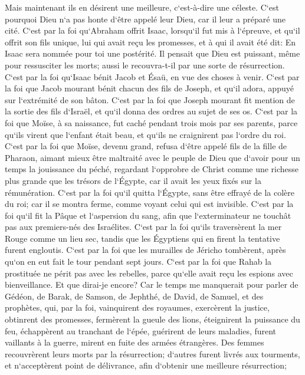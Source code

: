 \verse Mais maintenant ils en désirent une meilleure, c`est-à-dire une céleste. C`est pourquoi Dieu n`a pas honte d`être appelé leur Dieu, car il leur a préparé une cité. 
\verse C`est par la foi qu`Abraham offrit Isaac, lorsqu`il fut mis à l`épreuve, et qu`il offrit son fils unique, lui qui avait reçu les promesses, 
\verse et à qui il avait été dit: En Isaac sera nommée pour toi une postérité. 
\verse Il pensait que Dieu est puissant, même pour ressusciter les morts; aussi le recouvra-t-il par une sorte de résurrection. 
\verse C`est par la foi qu`Isaac bénit Jacob et Ésaü, en vue des choses à venir. 
\verse C`est par la foi que Jacob mourant bénit chacun des fils de Joseph, et qu`il adora, appuyé sur l`extrémité de son bâton. 
\verse C`est par la foi que Joseph mourant fit mention de la sortie des fils d`Israël, et qu`il donna des ordres au sujet de ses os. 
\verse C`est par la foi que Moïse, à sa naissance, fut caché pendant trois mois par ses parents, parce qu`ils virent que l`enfant était beau, et qu`ils ne craignirent pas l`ordre du roi. 
\verse C`est par la foi que Moïse, devenu grand, refusa d`être appelé fils de la fille de Pharaon, 
\verse aimant mieux être maltraité avec le peuple de Dieu que d`avoir pour un temps la jouissance du péché, 
\verse regardant l`opprobre de Christ comme une richesse plus grande que les trésors de l`Égypte, car il avait les yeux fixés sur la rémunération. 
\verse C`est par la foi qu`il quitta l`Égypte, sans être effrayé de la colère du roi; car il se montra ferme, comme voyant celui qui est invisible. 
\verse C`est par la foi qu`il fit la Pâque et l`aspersion du sang, afin que l`exterminateur ne touchât pas aux premiers-nés des Israélites. 
\verse C`est par la foi qu`ils traversèrent la mer Rouge comme un lieu sec, tandis que les Égyptiens qui en firent la tentative furent engloutis. 
\verse C`est par la foi que les murailles de Jéricho tombèrent, après qu`on en eut fait le tour pendant sept jours. 
\verse C`est par la foi que Rahab la prostituée ne périt pas avec les rebelles, parce qu`elle avait reçu les espions avec bienveillance. 
\verse Et que dirai-je encore? Car le temps me manquerait pour parler de Gédéon, de Barak, de Samson, de Jephthé, de David, de Samuel, et des prophètes, 
\verse qui, par la foi, vainquirent des royaumes, exercèrent la justice, obtinrent des promesses, fermèrent la gueule des lions, 
\verse éteignirent la puissance du feu, échappèrent au tranchant de l`épée, guérirent de leurs maladies, furent vaillants à la guerre, mirent en fuite des armées étrangères. 
\verse Des femmes recouvrèrent leurs morts par la résurrection; d`autres furent livrés aux tourments, et n`acceptèrent point de délivrance, afin d`obtenir une meilleure résurrection; 
